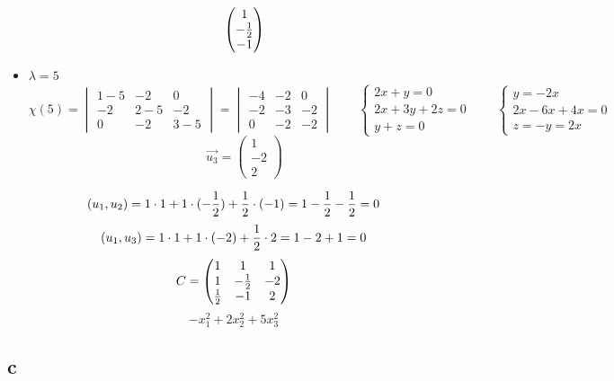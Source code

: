 \begin{itemize}
$$    \begin{pmatrix}
    	1 \\
        -\frac{1}2 \\
        -1
    \end{pmatrix} $$
    \item $ \lambda = 5 $
    $$ \chi(5) =
    \begin{vmatrix}
    	1 - 5 & -2 & 0 \\
        -2 & 2 - 5 & -2 \\
        0 & -2 & 3 - 5
    \end{vmatrix} =
    \begin{vmatrix}
    	-4 & -2 & 0 \\
        -2 & -3 & -2 \\
        0 & -2 & -2
    \end{vmatrix} \qquad
    \begin{cases}
    	2x + y = 0 \\
        2x + 3y + 2z = 0 \\
        y + z = 0
    \end{cases} \qquad
    \begin{cases}
    	y = -2x \\
        2x - 6x + 4x = 0 \\
        z = -y = 2x
    \end{cases} $$
    $$ \vec{u_3} =
    \begin{pmatrix}
    	1 \\
        -2 \\
        2
    \end{pmatrix} $$
\end{itemize}

$$ (u_1, u_2) = 1 \cdot 1 + 1 \cdot (-\frac{1}2) + \frac{1}2 \cdot (-1) = 1 - \frac{1}2 - \frac{1}2 = 0 $$
$$ (u_1, u_3) = 1 \cdot 1 + 1 \cdot (-2) + \frac{1}2 \cdot 2 = 1 - 2 + 1 = 0 $$
$$ C =
\begin{pmatrix}
	1 & 1 & 1 \\
    1 & -\frac{1}2 & -2 \\
    \frac{1}2 & -1 & 2
\end{pmatrix} $$
$$ -x_1^2 + 2x_2^2 + 5x_3^2 $$

\subsection{c}

